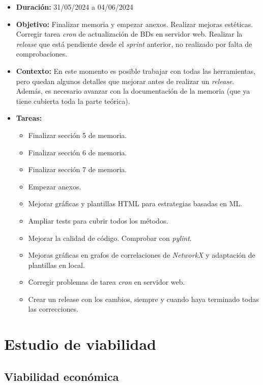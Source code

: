 \begin{itemize}
\item  
\textbf{Duración:} 31/05/2024 a 04/06/2024

\item
\textbf{Objetivo:} Finalizar memoria y empezar anexos. Realizar mejoras estéticas. Corregir tarea \emph{cron} de actualización de BDs en servidor web. Realizar la \emph{release} que está pendiente desde el \emph{sprint} anterior, no realizado por falta de comprobaciones. 


\item
\textbf{Contexto:} En este momento es posible trabajar con todas las herramientas, pero quedan algunos detalles que mejorar antes de realizar un \emph{release}. Además, es necesario avanzar con la documentación de la memoria (que ya tiene cubierta toda la parte teórica). 


\item
\textbf{Tareas:}
	\begin{itemize}
	\tightlist
	\item 
	Finalizar sección 5 de memoria.
	\item
	Finalizar sección 6 de memoria.
	\item
	Finalizar sección 7 de memoria.
	\item
	Empezar anexos. 
	\item
	Mejorar gráficas y plantillas HTML para estrategias basadas en ML. 
	\item
	Ampliar tests para cubrir todos los métodos. 
	\item
	Mejorar la calidad de código. Comprobar con \emph{pylint}.  
	\item
	Mejoras gráficas en grafos de correlaciones de \emph{NetworkX} y adaptación de plantillas en local.
	\item
	Corregir problemas de tarea \emph{cron} en servidor web. 
	\item
	Crear un release con los cambios, siempre y cuando haya terminado todas las correcciones.
  	\end{itemize}
\end{itemize}




\section{Estudio de viabilidad}

\subsection{Viabilidad económica}

